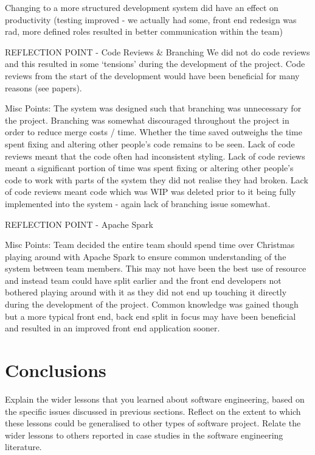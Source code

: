 \documentclass{l3proj}
\begin{document}
Changing to a more structured development system did have an effect on productivity (testing improved - we actually had some, front end redesign was rad, more defined roles resulted in better communication within the team)

REFLECTION POINT - Code Reviews & Branching
We did not do code reviews and this resulted in some ‘tensions’ during the development of the project. Code reviews from the start of the development would have been beneficial for many reasons (see papers).

Misc Points:
The system was designed such that branching was unnecessary for the project. Branching was somewhat discouraged throughout the project in order to reduce merge costs / time. Whether the time saved outweighs the time spent fixing and altering other people’s code remains to be seen.
Lack of code reviews meant that the code often had inconsistent styling.
Lack of code reviews meant a significant portion of time was spent fixing or altering other people's code to work with parts of the system they did not realise they had broken.
Lack of code reviews meant code which was WIP was deleted prior to it being fully implemented into the system - again lack of branching issue somewhat.

REFLECTION POINT - Apache Spark

Misc Points:
Team decided the entire team should spend time over Christmas playing around with Apache Spark to ensure common understanding of the system between team members. This may not have been the best use of resource and instead team could have split earlier and the front end developers not bothered playing around with it as they did not end up touching it directly during the development of the project. Common knowledge was gained though but a more typical front end, back end split in focus may have been beneficial and resulted in an improved front end application sooner.

\section{Conclusions}
\label{sec:conclusions}

Explain the wider lessons that you learned about software engineering,
based on the specific issues discussed in previous sections.  Reflect
on the extent to which these lessons could be generalised to other
types of software project.  Relate the wider lessons to others
reported in case studies in the software engineering literature.



\end{document}

